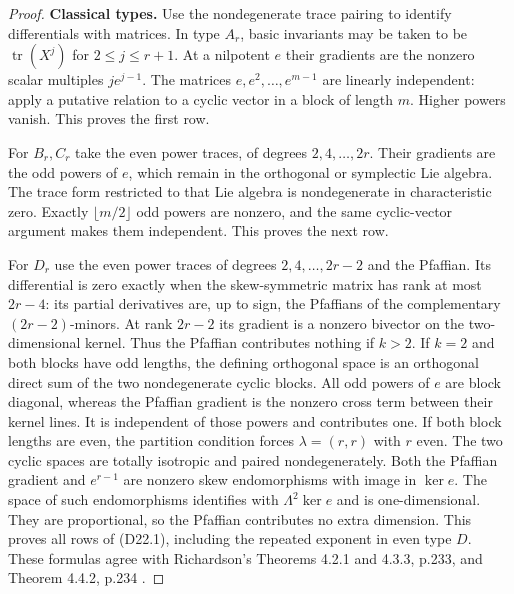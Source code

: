 

\begin{proof}
\par\medskip\noindent\textbf{Classical types.}\quad
Use the nondegenerate trace pairing to identify differentials with
matrices.  In type $A_r$, basic invariants may be taken to be
$\operatorname{tr}(X^j)$ for $2\le j\le r+1$.  At a nilpotent $e$
their gradients are the nonzero scalar multiples $j e^{j-1}$.
The matrices $e,e^2,\ldots,e^{m-1}$ are linearly independent: apply a
putative relation to a cyclic vector in a block of length $m$.
Higher powers vanish.  This proves the first row.

For $B_r,C_r$ take the even power traces, of degrees $2,4,\ldots,2r$.
Their gradients are the odd powers of $e$, which remain in the
orthogonal or symplectic Lie algebra.  The trace form restricted to
that Lie algebra is nondegenerate in characteristic zero.  Exactly
$\lfloor m/2\rfloor$ odd powers are nonzero, and the same cyclic-vector
argument makes them independent.  This proves the next row.

For $D_r$ use the even power traces of degrees $2,4,\ldots,2r-2$
and the Pfaffian.  Its differential is zero exactly when the
skew-symmetric matrix has rank at most $2r-4$: its partial derivatives
are, up to sign, the Pfaffians of the complementary $(2r-2)$-minors.
At rank $2r-2$ its gradient is a nonzero bivector on the two-dimensional
kernel.  Thus the Pfaffian contributes nothing if $k>2$.
If $k=2$ and both blocks have odd lengths, the defining orthogonal
space is an orthogonal direct sum of the two nondegenerate cyclic
blocks.  All odd powers of $e$ are block diagonal, whereas the
Pfaffian gradient is the nonzero cross term between their kernel
lines.  It is independent of those powers and contributes one.
If both block lengths are even, the partition condition forces
$\lambda=(r,r)$ with $r$ even.  The two cyclic spaces are totally
isotropic and paired nondegenerately.  Both the Pfaffian gradient
and $e^{r-1}$ are nonzero skew endomorphisms with image in $\ker e$.
The space of such endomorphisms identifies with
$\Lambda^2\ker e$ and is one-dimensional.  They are proportional,
so the Pfaffian contributes no extra dimension.  This proves all
rows of (D22.1), including the repeated exponent in even type $D$.
These formulas agree with Richardson's Theorems 4.2.1 and 4.3.3,
p.233, and Theorem 4.4.2, p.234 \cite{D-Richardson1987}.


\end{proof}
